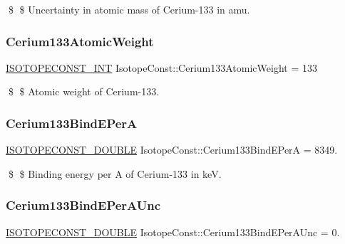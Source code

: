 \$ \$ Uncertainty in atomic mass of Cerium-\/133 in amu. \mbox{\label{group___isotope_const-_cerium-_ce133_ga70c9b8c17f1bacbd322b272ec5a57dc6}} 
\subsubsection{\texorpdfstring{Cerium133\+Atomic\+Weight}{Cerium133AtomicWeight}}
{\footnotesize\ttfamily \mbox{\hyperlink{group___isotope_const-_macros_ga5f18360b3e99483a35c32d789e62621c}{I\+S\+O\+T\+O\+P\+E\+C\+O\+N\+S\+T\+\_\+\+I\+NT}} Isotope\+Const\+::\+Cerium133\+Atomic\+Weight = 133}

\$ \$ Atomic weight of Cerium-\/133. \mbox{\label{group___isotope_const-_cerium-_ce133_ga9e6119c4e99de974d2c783cd3f209dce}} 
\subsubsection{\texorpdfstring{Cerium133\+Bind\+E\+PerA}{Cerium133BindEPerA}}
{\footnotesize\ttfamily \mbox{\hyperlink{group___isotope_const-_macros_ga8f45a7272ce02c0b4c65c44636ed719a}{I\+S\+O\+T\+O\+P\+E\+C\+O\+N\+S\+T\+\_\+\+D\+O\+U\+B\+LE}} Isotope\+Const\+::\+Cerium133\+Bind\+E\+PerA = 8349.}

\$ \$ Binding energy per A of Cerium-\/133 in keV. \mbox{\label{group___isotope_const-_cerium-_ce133_ga8faa581ab7c889dc02de685c4809c169}} 
\subsubsection{\texorpdfstring{Cerium133\+Bind\+E\+Per\+A\+Unc}{Cerium133BindEPerAUnc}}
{\footnotesize\ttfamily \mbox{\hyperlink{group___isotope_const-_macros_ga8f45a7272ce02c0b4c65c44636ed719a}{I\+S\+O\+T\+O\+P\+E\+C\+O\+N\+S\+T\+\_\+\+D\+O\+U\+B\+LE}} Isotope\+Const\+::\+Cerium133\+Bind\+E\+Per\+A\+Unc = 0.}

